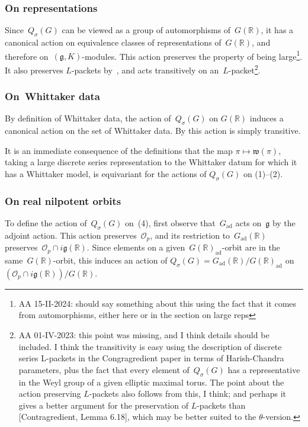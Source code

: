\documentclass[10pt,leqno]{article}
\newcommand{\Gad}{G_\mathrm{ad}}
\renewcommand{\O}{\mathcal O}
\newcommand{\R}{\mathbb R}
\newcommand{\g}{\mathfrak g}
\newcommand{\w}{\mathfrak w}
\newcommand{\Op}{\O_p}
\begin{document}
\subsubsection*{On representations} 
Since~$Q_\sigma(G)$ can be viewed as a group of automorphisms of~$G(\R)$,  it has a canonical action on equivalence classes of representations of~$G(\R)$, and therefore on~$(\g, K)$-modules. This action preserves  the property of being large\footnote{AA 15-II-2024: should say something about this using the fact that it comes from automorphisms, either here or in the section on large reps}. It also preserves $L$-packets by~\cite[Lemma 6.18]{Contragredient}, and acts transitively on an~$L$-packet\footnote{AA 01-IV-2023: this point was missing, and I think details should be included. I think the transitivity is easy using  the description of discrete series L-packets in the Congragredient paper in terms of Harish-Chandra parameters, plus the fact that every element of~$Q_{\sigma}(G)$ has a representative in the Weyl group of a given elliptic maximal torus. The point about the action preserving $L$-packets also follows from this, I think; and perhaps it gives a better argument for the preservation of $L$-packets than [Contragredient, Lemma 6.18], which may be better suited to the $\theta$-version.}.

\subsubsection*{On~Whittaker data}  By definition of Whittaker data, the action of~$Q_{\sigma}(G)$ on $G(\R)$ induces a canonical action on the set of Whittaker data. By \cite[(14.15)]{abv} this action is simply transitive. 

It is an immediate consequence of the definitions that the map $\pi \mapsto \w(\pi)$, taking a large discrete series representation to the Whittaker datum for which it has a Whittaker model, is equivariant for the actions of $Q_{\sigma}(G)$ on (1)--(2). 


\subsubsection*{On real nilpotent orbits} 

To define the action of~$Q_{\sigma}(G)$ on~(4), first observe that~$\Gad$ acts on~$\g$ by the adjoint action. This action preserves~$\Op$, and its restriction to~$\Gad(\R)$ preserves~$\Op\cap i\g(\R)$. Since elements on a given~$G(\R)_{\mathrm{ad}}$-orbit are in the same~$G(\R)$-orbit, this induces an action of $Q_{\sigma}(G)=\Gad(\R)/G(\R)_{\mathrm{ad}}$ on~$(\Op\cap i\g(\R))/G(\R)$.
\end{document}
